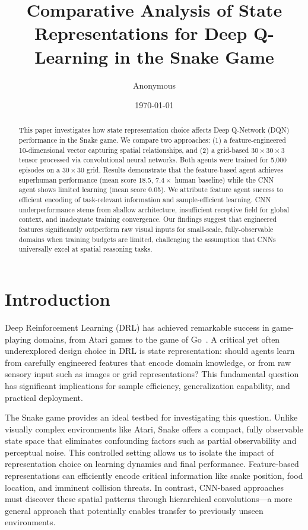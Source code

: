 \documentclass[10pt,a4paper,twocolumn]{article}
\title{Comparative Analysis of State Representations for Deep Q-Learning in the Snake Game}
\author{Anonymous}
\date{\today}
\begin{document}
\maketitle

\begin{abstract}
This paper investigates how state representation choice affects Deep Q-Network (DQN) performance in the Snake game. We compare two approaches: (1) a feature-engineered 10-dimensional vector capturing spatial relationships, and (2) a grid-based $30 \times 30 \times 3$ tensor processed via convolutional neural networks. Both agents were trained for 5,000 episodes on a $30 \times 30$ grid. Results demonstrate that the feature-based agent achieves superhuman performance (mean score 18.5, $7.4\times$ human baseline) while the CNN agent shows limited learning (mean score 0.05). We attribute feature agent success to efficient encoding of task-relevant information and sample-efficient learning. CNN underperformance stems from shallow architecture, insufficient receptive field for global context, and inadequate training convergence. Our findings suggest that engineered features significantly outperform raw visual inputs for small-scale, fully-observable domains when training budgets are limited, challenging the assumption that CNNs universally excel at spatial reasoning tasks.
\end{abstract}

\section{Introduction}

Deep Reinforcement Learning (DRL) has achieved remarkable success in game-playing domains, from Atari games to the game of Go~\cite{mnih2015human}. A critical yet often underexplored design choice in DRL is state representation: should agents learn from carefully engineered features that encode domain knowledge, or from raw sensory input such as images or grid representations? This fundamental question has significant implications for sample efficiency, generalization capability, and practical deployment.

The Snake game provides an ideal testbed for investigating this question. Unlike visually complex environments like Atari, Snake offers a compact, fully observable state space that eliminates confounding factors such as partial observability and perceptual noise. This controlled setting allows us to isolate the impact of representation choice on learning dynamics and final performance. Feature-based representations can efficiently encode critical information like snake position, food location, and imminent collision threats. In contrast, CNN-based approaches must discover these spatial patterns through hierarchical convolutions---a more general approach that potentially enables transfer to previously unseen environments.
\end{document}
